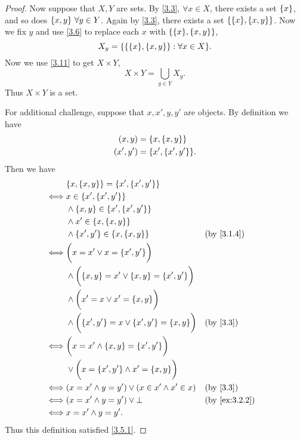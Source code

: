 \begin{proof}
	Now suppose that \(X, Y\) are sets.
	By \cref{3.3}, \(\forall x \in X\), there exists a set \(\left\lbrace x\right\rbrace\), and so does \(\set{x, y} \ \forall y \in Y\).
	Again by \cref{3.3}, there exists a set \(\set{\set{x}, \set{x, y}}\).
	Now we fix \(y\) and use \cref{3.6} to replace each \(x\) with \(\set{\set{x}, \set{x, y}}\),
	\[
		X_y = \set{\set{\set{x}, \set{x, y}} : \forall x \in X}.
	\]
	Now we use \cref{3.11} to get \(X \times Y\),
	\[
		X \times Y = \bigcup_{y \in Y} X_y.
	\]
	Thus \(X \times Y\) is a set.

	For additional challenge, suppose that \(x, x', y, y'\) are objects.
	By definition we have
	\begin{align*}
		(x, y)   & = \set{x, \set{x, y}}     \\
		(x', y') & = \set{x', \set{x', y'}}.
	\end{align*}
	Then we have
	\begin{align*}
		     & \set{x, \set{x, y}} = \set{x', \set{x', y'}}                                         \\
		\iff & x \in \set{x', \set{x', y'}}                                                         \\
		     & \land \set{x, y} \in \set{x', \set{x', y'}}                                          \\
		     & \land x' \in \set{x, \set{x, y}}                                                     \\
		     & \land \set{x', y'} \in \set{x, \set{x, y}}                        &  & \by{3.1.4}    \\
		\iff & \bigg(x = x' \lor x = \set{x', y'}\bigg)                                             \\
		     & \land \bigg(\set{x, y} = x' \lor \set{x, y} = \set{x', y'}\bigg)                     \\
		     & \land \bigg(x' = x \lor x' = \set{x, y}\bigg)                                        \\
		     & \land \bigg(\set{x', y'} = x \lor \set{x', y'} = \set{x, y}\bigg) &  & \by{3.3}      \\
		\iff & \bigg(x = x' \land \set{x, y} = \set{x', y'}\bigg)                                   \\
		     & \lor \bigg(x = \set{x', y'} \land x' = \set{x, y}\bigg)                              \\
		\iff & (x = x' \land y = y') \lor (x \in x' \land x' \in x)              &  & \by{3.3}      \\
		\iff & (x = x' \land y = y') \lor \bot                                   &  & \by{ex:3.2.2} \\
		\iff & x = x' \land y = y'.
	\end{align*}
	Thus this definition satisfied \cref{3.5.1}.
\end{proof}

